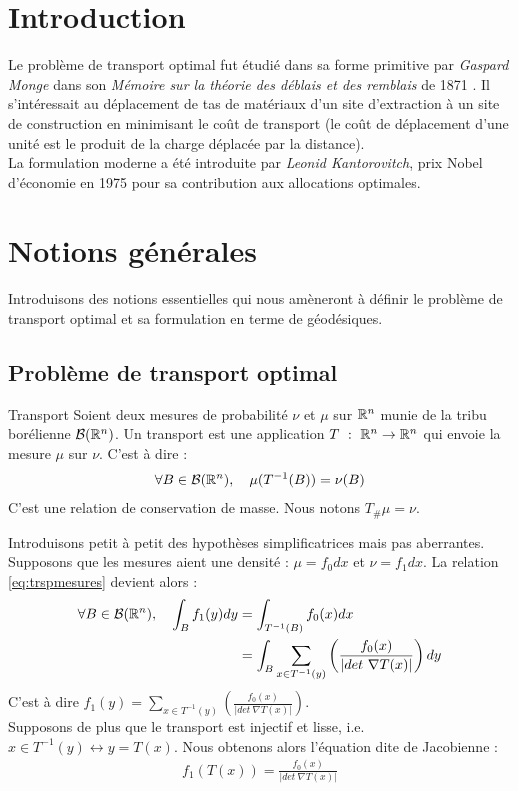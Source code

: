 \documentclass[a4paper,12pt]{article}
\title{\titre }
\author{\auteur}
\date{\dateDoc}
\begin{document}
\thispagestyle{empty}
\maketitle
\tableofcontents
\newpage
\section{Introduction}
Le problème de transport optimal fut étudié dans sa forme primitive par \emph{Gaspard Monge} dans son \emph{Mémoire sur la théorie des déblais et des remblais} de 1871 \cite{monge}. Il s'intéressait au déplacement de tas de matériaux d'un site d'extraction à un site de construction en minimisant le coût de transport (le coût de déplacement d'une unité est le produit de la charge déplacée par la distance). \\
La formulation moderne a été introduite par \emph{Leonid Kantorovitch}, prix Nobel d'économie en 1975 pour sa contribution aux allocations optimales.  
\newpage

\section{Notions générales}
Introduisons des notions essentielles qui nous amèneront à définir le problème de transport optimal et sa formulation en terme de géodésiques. 
\subsection{Problème de transport optimal}
\begin{definition}{Transport}
Soient deux mesures de probabilité $\nu$ et $\mu$ sur $\mathbb{R}^n$ munie de la tribu borélienne $\mathcal{B}(\mathbb{R}^n)$. Un transport est une application $T\ :\ \RR^n\rightarrow\RR^n$ qui envoie la mesure $\mu$ sur $\nu$. C'est à dire : 
\begin{align}
\forall B\in\mathcal{B}(\mathbb{R}^n),\quad \mu(T^{-1}(B))=\nu(B)
\label{eq:trspmesures}
\end{align}
C'est une relation de conservation de masse. Nous notons $T_{\#}\mu=\nu$. 
\end{definition}
Introduisons petit à petit des hypothèses simplificatrices mais pas aberrantes. Supposons que les mesures aient une densité : $\mu = f_0 dx$ et $\nu = f_1 dx$. La relation \eqref{eq:trspmesures} devient alors : 
\begin{align*}
\forall B \in\mathcal{B}(\mathbb{R}^n),\quad \int_B f_1(y)dy&=\int_{T^{-1}(B)} f_0(x) dx \\
&= \int_B \sum_{x\in T^{-1}(y)} \left(\frac{f_0(x)}{|det\ \nabla T(x)|}\right)dy\\
\end{align*}
C'est à dire $f_1(y) = \sum_{x\in T^{-1}(y)} \left(\frac{f_0(x)}{|det\ \nabla T(x)|}\right)$.\\
Supposons de plus que le transport est injectif et lisse, i.e. $x\in T^{-1}(y) \leftrightarrow y=T(x)$. Nous obtenons alors l'équation dite de Jacobienne : 
\begin{align}
f_1(T(x)) = \frac{f_0(x)}{|det\ \nabla T(x)|}
\label{eq:jacobienne}
\end{align}
\end{document}
